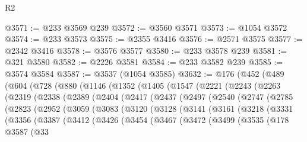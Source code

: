 \begin{lexlean}{R2}
\begin{coremodule}
@3571 := @233 @3569 @239
@3572 := @3560 @3571
@3573 := @1054 @3572
@3574 := @233 @3573
@3575 := @2355 @3416
@3576 := @2571 @3575
@3577 := @2342 @3416
@3578 := @3576 @3577
@3580 := @233 @3578 @239
@3581 := @321 @3580
@3582 := @2226 @3581
@3584 := @233 @3582 @239
@3585 := @3574 @3584
@3587 := @3537 (@1054 @3585)
@3632 := @176
    (@452
      (@489
        (@604
          (@728
            (@880
              (@1146
                (@1352
                  (@1405
                    (@1547
                      (@2221
                        (@2243
                          (@2263
                            (@2319
                              (@2338
                                (@2389
                                  (@2404
                                    (@2417
                                      (@2437
                                        (@2497
                                          (@2540
                                            (@2747
                                              (@2785
                                                (@2823
                                                  (@2952
                                                    (@3059
                                                      (@3083
                                                        (@3120
                                                          (@3128
                                                            (@3141
                                                              (@3161
                                                                (@3218
                                                                  (@3331
                                                                    (@3356
                                                                      (@3387
                                                                        (@3412
                                                                          (@3426
                                                                            (@3454
                                                                              (@3467
                                                                                (@3472
                                                                                  (@3499
                                                                                    (@3535
                                                                                      (@178
                                                                                        @3587
                                                                                        (@33

\end{coremodule}
\end{lexlean}
